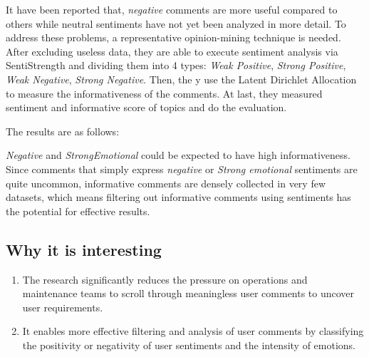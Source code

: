 \documentclass[10pt,conference]{IEEEtran}
\begin{document}
It have been reported that, \emph{negative} comments are more  useful compared to others while neutral sentiments have not yet been analyzed in more detail. To address these problems, a representative opinion-mining technique is needed. After excluding useless data, they are able to execute sentiment analysis via SentiStrength and dividing them into 4 types: \emph{Weak Positive}, \emph{Strong Positive}, \emph{Weak Negative}, \emph{Strong Negative}. Then, the y use the Latent Dirichlet Allocation to measure the informativeness of the comments. At last, they measured sentiment and informative score of topics and do the evaluation. 

The results are as follows:

\emph{Negative} and \emph{StrongEmotional} could be expected to have high informativeness. Since comments that simply express \emph{negative} or \emph{Strong emotional} sentiments are quite uncommon, informative comments are densely collected in very few datasets, which means filtering out informative comments using sentiments has the potential for effective results.

\subsection{Why it is interesting}
\begin{enumerate}
    \item The research significantly reduces the pressure on operations and maintenance teams to scroll through meaningless user comments to uncover user requirements.
    \item It enables more effective filtering and analysis of user comments by classifying the positivity or negativity of user sentiments and the intensity of emotions.
\end{enumerate}

\printbibliography{} 
\end{document}
